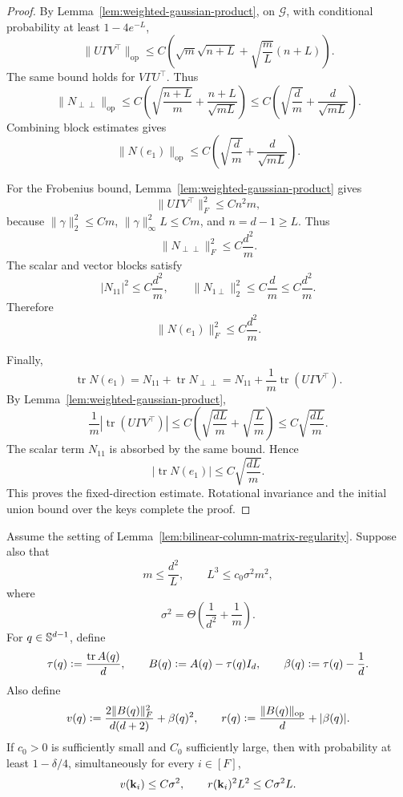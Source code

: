 \begin{proof}
By Lemma~\ref{lem:weighted-gaussian-product}, on \(\mathcal G\), with conditional
probability at least \(1-4e^{-L}\),
\[
\|U\Gamma V^\top\|_{\mathrm{op}}
\le
C\left(\sqrt m\sqrt{n+L}+\sqrt{\frac mL}(n+L)\right).
\]
The same bound holds for \(V\Gamma U^\top\). Thus
\[
\|N_{\perp\perp}\|_{\mathrm{op}}
\le
C\left(\sqrt{\frac{n+L}{m}}+\frac{n+L}{\sqrt{mL}}\right)
\le
C\left(\sqrt{\frac dm}+\frac d{\sqrt{mL}}\right).
\]
Combining block estimates gives
\[
\|N(e_1)\|_{\mathrm{op}}
\le
C\left(\sqrt{\frac dm}+\frac d{\sqrt{mL}}\right).
\]

For the Frobenius bound, Lemma~\ref{lem:weighted-gaussian-product} gives
\[
\|U\Gamma V^\top\|_F^2\le Cn^2m,
\]
because \(\|\gamma\|_2^2\le Cm\), \(\|\gamma\|_\infty^2L\le Cm\), and
\(n=d-1\ge L\). Thus
\[
\|N_{\perp\perp}\|_F^2\le C\frac{d^2}{m}.
\]
The scalar and vector blocks satisfy
\[
|N_{11}|^2\le C\frac{d^2}{m},
\qquad
\|N_{1\perp}\|_2^2\le C\frac dm\le C\frac{d^2}{m}.
\]
Therefore
\[
\|N(e_1)\|_F^2\le C\frac{d^2}{m}.
\]

Finally,
\[
\operatorname{tr}N(e_1)
=
N_{11}+\operatorname{tr}N_{\perp\perp}
=
N_{11}+\frac1m\operatorname{tr}(U\Gamma V^\top).
\]
By Lemma~\ref{lem:weighted-gaussian-product},
\[
\frac1m|\operatorname{tr}(U\Gamma V^\top)|
\le
C\left(\sqrt{\frac{dL}{m}}+\sqrt{\frac Lm}\right)
\le
C\sqrt{\frac{dL}{m}}.
\]
The scalar term \(N_{11}\) is absorbed by the same bound. Hence
\[
|\operatorname{tr}N(e_1)|
\le
C\sqrt{\frac{dL}{m}}.
\]
This proves the fixed-direction estimate. Rotational invariance and the initial
union bound over the keys complete the proof.
\end{proof}

\begin{lemma}
\label{lem:bilinear-column-parameters}
Assume the setting of Lemma~\ref{lem:bilinear-column-matrix-regularity}. Suppose
also that
\[
m\le \frac{d^2}{L},
\qquad
L^3\le c_0\sigma^2m^2,
\]
where
\[
\sigma^2=\Theta\left(\frac1{d^2}+\frac1m\right).
\]
For \(q\in\mathbb{S}^{d-1}\), define
\[
\tau(q)\vcentcolon= \frac{\operatorname{tr}A(q)}{d},
\qquad
B(q)\vcentcolon= A(q)-\tau(q)I_d,
\qquad
\beta(q)\vcentcolon= \tau(q)-\frac1d.
\]
Also define
\[
v(q)\vcentcolon= \frac{2\|B(q)\|_F^2}{d(d+2)}+\beta(q)^2,
\qquad
r(q)\vcentcolon= \frac{\|B(q)\|_{\mathrm{op}}}{d}+|\beta(q)|.
\]
If \(c_0>0\) is sufficiently small and \(C_0\) sufficiently large, then with
probability at least \(1-\delta/4\), simultaneously for every \(i\in[F]\),
\[
v({\mathbf{k}}_i)\le C\sigma^2,
\qquad
r({\mathbf{k}}_i)^2L^2\le C\sigma^2L.
\]
\end{lemma}

